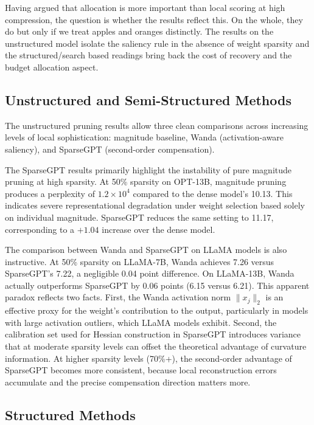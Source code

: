 Having argued that allocation is more important than local scoring at high compression, the question is whether the results reflect this. On the whole, they do but only if we treat apples and oranges distinctly. The results on the unstructured model isolate the saliency rule in the absence of weight sparsity and the structured/search based readings bring back the cost of recovery and the budget allocation aspect.

\subsection{Unstructured and Semi-Structured Methods}
\label{subsec:unstructured_results}

The unstructured pruning results allow three clean comparisons across increasing levels of local sophistication: magnitude baseline, Wanda (activation-aware saliency), and SparseGPT (second-order compensation).

The SparseGPT results primarily highlight the instability of pure magnitude pruning at high sparsity. At 50\% sparsity on OPT-13B, magnitude pruning produces a perplexity of $1.2\times10^4$ compared to the dense model's 10.13. This indicates severe representational degradation under weight selection based solely on individual magnitude. SparseGPT reduces the same setting to 11.17, corresponding to a $+1.04$ increase over the dense model.

The comparison between Wanda and SparseGPT on LLaMA models is also instructive. At 50\% sparsity on LLaMA-7B, Wanda achieves 7.26 versus SparseGPT's 7.22, a negligible 0.04 point difference. On LLaMA-13B, Wanda actually outperforms SparseGPT by 0.06 points (6.15 versus 6.21). This apparent paradox reflects two facts. First, the Wanda activation norm $\|x_j\|_2$ is an effective proxy for the weight's contribution to the output, particularly in models with large activation outliers, which LLaMA models exhibit. Second, the calibration set used for Hessian construction in SparseGPT introduces variance that at moderate sparsity levels can offset the theoretical advantage of curvature information. At higher sparsity levels (70\%+), the second-order advantage of SparseGPT becomes more consistent, because local reconstruction errors accumulate and the precise compensation direction matters more.

\subsection{Structured Methods}
\label{subsec:structured_results_discussion}

